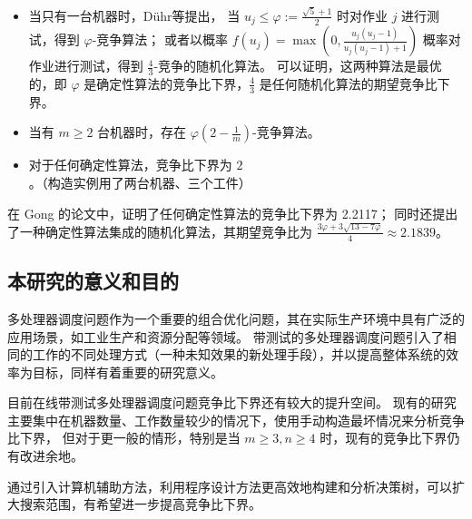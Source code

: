 \begin{itemize}
    \item 当只有一台机器时，Dühr等\cite{durr2018scheduling}\cite{durr2020adversarial}提出，
    当 $u_j \leq \varphi := \frac{\sqrt{5}+1}{2}$ 时对作业 $j$ 进行测试，得到 $\varphi$-竞争算法；
    或者以概率 $f(u_j) = \max \left(0, \frac{u_j(u_j-1)}{u_j(u_j-1)+1}\right)$ 概率对作业进行测试，得到 $\frac43$-竞争的随机化算法。
    可以证明\cite{albers2021explorable}，这两种算法是最优的，即 $\varphi$ 是确定性算法的竞争比下界，$\frac43$ 是任何随机化算法的期望竞争比下界。
    \item 当有 $m\geq 2$ 台机器时，存在 $\varphi(2-\frac1m)$-竞争算法\cite{graham1966bounds}。
    \item 对于任何确定性算法，竞争比下界为 $2$。（构造实例用了两台机器、三个工件）\cite{albers2021scheduling}
\end{itemize}

在 Gong 的论文\cite{gong2023randomized}中，证明了任何确定性算法的竞争比下界为 2.2117；
同时还提出了一种确定性算法集成的随机化算法，其期望竞争比为 $\frac{3\varphi+3\sqrt{13-7\varphi}}{4}\approx 2.1839$。

\subsection{本研究的意义和目的}

多处理器调度问题作为一个重要的组合优化问题，其在实际生产环境中具有广泛的应用场景，如工业生产和资源分配等领域。
带测试的多处理器调度问题引入了相同的工作的不同处理方式（一种未知效果的新处理手段），并以提高整体系统的效率为目标，同样有着重要的研究意义。

目前在线带测试多处理器调度问题竞争比下界还有较大的提升空间。
现有的研究主要集中在机器数量、工作数量较少的情况下，使用手动构造最坏情况来分析竞争比下界，
但对于更一般的情形，特别是当 $m \geq 3, n\geq 4$ 时，现有的竞争比下界仍有改进余地。

通过引入计算机辅助方法，利用程序设计方法更高效地构建和分析决策树，可以扩大搜索范围，有希望进一步提高竞争比下界。